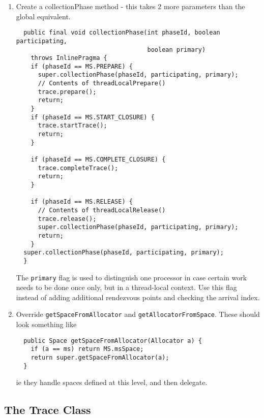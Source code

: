 \documentclass[10pt]{article}
\newcommand{\code}[1]{\lstinline!#1!}
\begin{document}
\begin{enumerate}
\item Create a collectionPhase method - this takes 2 more parameters
  than the global equivalent.
\begin{lstlisting}
  public final void collectionPhase(int phaseId, boolean participating,
                                    boolean primary)
    throws InlinePragma {
    if (phaseId == MS.PREPARE) {
      super.collectionPhase(phaseId, participating, primary);
      // Contents of threadLocalPrepare()
      trace.prepare();
      return;
    }    
    if (phaseId == MS.START_CLOSURE) {
      trace.startTrace();
      return;
    }

    if (phaseId == MS.COMPLETE_CLOSURE) {
      trace.completeTrace();
      return;
    }

    if (phaseId == MS.RELEASE) {
      // Contents of threadLocalRelease()
      trace.release();
      super.collectionPhase(phaseId, participating, primary);
      return;
    }
  super.collectionPhase(phaseId, participating, primary);
  }
\end{lstlisting}
  The \code{primary} flag is used to distinguish one processor in case
  certain work needs to be done once only, but in a thread-local
  context.  Use this flag instead of adding additional rendezvous
  points and checking the arrival index.

\item Override \code{getSpaceFromAllocator} and
  \code{getAllocatorFromSpace}.  These should look something like
\begin{lstlisting}
  public Space getSpaceFromAllocator(Allocator a) {
    if (a == ms) return MS.msSpace;
    return super.getSpaceFromAllocator(a);
  }
\end{lstlisting}

  ie they handle spaces defined at this level, and then delegate.

\end{enumerate}

\subsection{The Trace Class}
\end{document}

